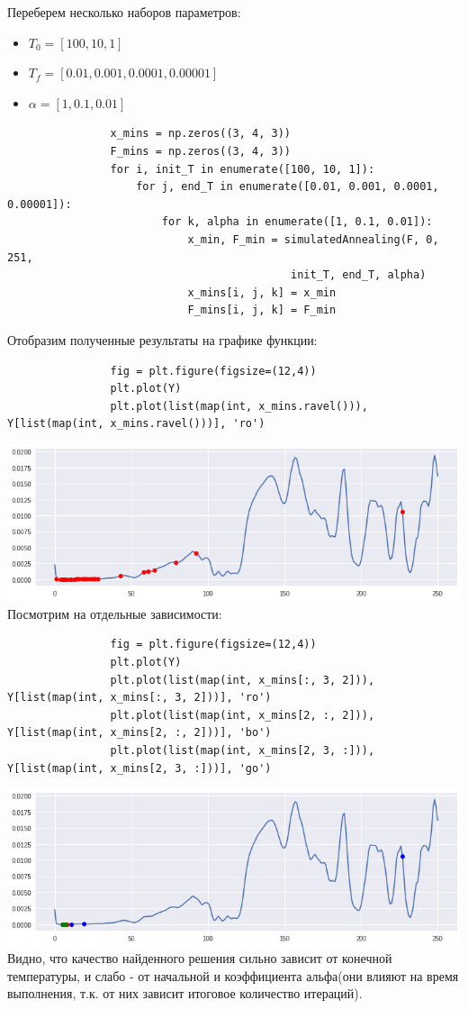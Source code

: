 \documentclass[a4paper]{article}
\begin{document}
			Переберем несколько наборов параметров:
			\begin{itemize}
				\item $T_0 = [100, 10, 1]$
				\item $T_f = [0.01, 0.001, 0.0001, 0.00001]$
				\item $\alpha = [1, 0.1, 0.01]$
			\end{itemize}
			\begin{verbatim}
				x_mins = np.zeros((3, 4, 3))
				F_mins = np.zeros((3, 4, 3))
				for i, init_T in enumerate([100, 10, 1]):
					for j, end_T in enumerate([0.01, 0.001, 0.0001, 0.00001]):
						for k, alpha in enumerate([1, 0.1, 0.01]):
							x_min, F_min = simulatedAnnealing(F, 0, 251,
											init_T, end_T, alpha)
							x_mins[i, j, k] = x_min
							F_mins[i, j, k] = F_min
			\end{verbatim}
			Отобразим полученные результаты на графике функции:
			\begin{verbatim}
				fig = plt.figure(figsize=(12,4))
				plt.plot(Y)
				plt.plot(list(map(int, x_mins.ravel())), Y[list(map(int, x_mins.ravel()))], 'ro')
			\end{verbatim}
			\includegraphics[width=\linewidth]{earr-2}
			Посмотрим на отдельные зависимости:
			\begin{verbatim}
				fig = plt.figure(figsize=(12,4))
				plt.plot(Y)
				plt.plot(list(map(int, x_mins[:, 3, 2])), Y[list(map(int, x_mins[:, 3, 2]))], 'ro')
				plt.plot(list(map(int, x_mins[2, :, 2])), Y[list(map(int, x_mins[2, :, 2]))], 'bo')
				plt.plot(list(map(int, x_mins[2, 3, :])), Y[list(map(int, x_mins[2, 3, :]))], 'go')
			\end{verbatim}
			\newpage
			\includegraphics[width=\linewidth]{earr-3}
			Видно, что качество найденного решения сильно зависит от конечной температуры, и слабо - от начальной и коэффициента альфа(они влияют на время выполнения, т.к. от них зависит итоговое количество итераций).
\end{document}
